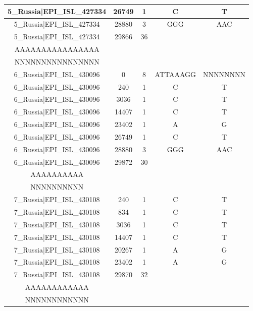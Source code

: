 \documentclass[a4paper,10pt]{article}
\begin{document}
\begin{longtable}{@{}ccccc@{}}
5\_Russia|EPI\_ISL\_427334 & 26749 & 1 & C & T \\* \midrule
5\_Russia|EPI\_ISL\_427334 & 28880 & 3 & GGG & AAC \\* \midrule
5\_Russia|EPI\_ISL\_427334 & 29866 & 36 & \begin{tabular}[c]{@{}c@{}}GACAAAAAAAAAAAAAAAAA\\ AAAAAAAAAAAAAAAA\end{tabular} & \begin{tabular}[c]{@{}c@{}}NNNNNNNNNNNNNNNNNNNN\\ NNNNNNNNNNNNNNNN\end{tabular} \\* \midrule
6\_Russia|EPI\_ISL\_430096 & 0 & 8 & ATTAAAGG & NNNNNNNN \\* \midrule
6\_Russia|EPI\_ISL\_430096 & 240 & 1 & C & T \\* \midrule
6\_Russia|EPI\_ISL\_430096 & 3036 & 1 & C & T \\* \midrule
6\_Russia|EPI\_ISL\_430096 & 14407 & 1 & C & T \\* \midrule
6\_Russia|EPI\_ISL\_430096 & 23402 & 1 & A & G \\* \midrule
6\_Russia|EPI\_ISL\_430096 & 26749 & 1 & C & T \\* \midrule
6\_Russia|EPI\_ISL\_430096 & 28880 & 3 & GGG & AAC \\* \midrule
6\_Russia|EPI\_ISL\_430096 & 29872 & 30 & \begin{tabular}[c]{@{}c@{}}AAAAAAAAAAAAAAAAAAAA\\ AAAAAAAAAA\end{tabular} & \begin{tabular}[c]{@{}c@{}}NNNNNNNNNNNNNNNNNNNN\\ NNNNNNNNNN\end{tabular} \\* \midrule
7\_Russia|EPI\_ISL\_430108 & 240 & 1 & C & T \\* \midrule
7\_Russia|EPI\_ISL\_430108 & 834 & 1 & C & T \\* \midrule
7\_Russia|EPI\_ISL\_430108 & 3036 & 1 & C & T \\* \midrule
7\_Russia|EPI\_ISL\_430108 & 14407 & 1 & C & T \\* \midrule
7\_Russia|EPI\_ISL\_430108 & 20267 & 1 & A & G \\* \midrule
7\_Russia|EPI\_ISL\_430108 & 23402 & 1 & A & G \\* \midrule
7\_Russia|EPI\_ISL\_430108 & 29870 & 32 & \begin{tabular}[c]{@{}c@{}}AAAAAAAAAAAAAAAAAAAA\\ AAAAAAAAAAAA\end{tabular} & \begin{tabular}[c]{@{}c@{}}NNNNNNNNNNNNNNNNNNNN\\ NNNNNNNNNNNN\end{tabular} \\* \bottomrule
\end{longtable}
\end{document}
